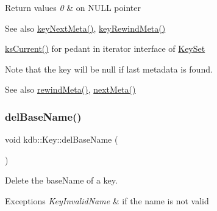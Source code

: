 \begin{DoxyRetVals}{Return values}
{\em 0} & on N\+U\+LL pointer \\
\hline
\end{DoxyRetVals}
\begin{DoxySeeAlso}{See also}
\mbox{\hyperlink{group__keymeta_ga4c88342f580a4291455a801af71ce048}{key\+Next\+Meta()}}, \mbox{\hyperlink{group__keymeta_ga5dbb669802eea27e106ee3a5e39717a9}{key\+Rewind\+Meta()}}

\mbox{\hyperlink{group__keyset_ga4287b9416912c5f2ab9c195cb74fb094}{ks\+Current()}} for pedant in iterator interface of \mbox{\hyperlink{classkdb_1_1KeySet}{Key\+Set}}
\end{DoxySeeAlso}
\begin{DoxyNote}{Note}
that the key will be null if last metadata is found.
\end{DoxyNote}

\begin{DoxyCode}{0}
\DoxyCodeLine{\{}
\DoxyCodeLine{\}}
\end{DoxyCode}


\begin{DoxySeeAlso}{See also}
\mbox{\hyperlink{classkdb_1_1Key_a002af206119ceed17b106e2449cedc91}{rewind\+Meta()}}, \mbox{\hyperlink{classkdb_1_1Key_a855f37fef58a4ea4006d9e281f66cfe1}{next\+Meta()}} 
\end{DoxySeeAlso}
\mbox{\label{classkdb_1_1Key_aec6af8723a31af40f9a16614ea46c341}} 
\subsubsection{\texorpdfstring{delBaseName()}{delBaseName()}}
{\footnotesize\ttfamily void kdb\+::\+Key\+::del\+Base\+Name (\begin{DoxyParamCaption}{ }\end{DoxyParamCaption})\hspace{0.3cm}{\ttfamily [inline]}}



Delete the base\+Name of a key. 


\begin{DoxyExceptions}{Exceptions}
{\em Key\+Invalid\+Name} & if the name is not valid \\
\hline
\end{DoxyExceptions}
\mbox{\label{classkdb_1_1Key_a2305da805095605aca38d53f2733fb57}} 

